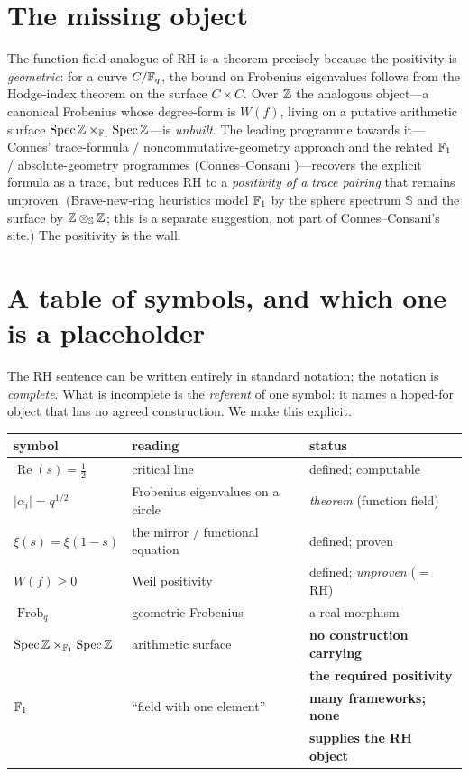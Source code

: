 \documentclass[11pt]{article}
\begin{document}
\section{The missing object}
The function-field analogue of RH is a theorem precisely because the positivity is
\emph{geometric}: for a curve $C/\mathbb{F}_q$, the bound on Frobenius eigenvalues follows
from the Hodge-index theorem on the surface $C\times C$. Over $\mathbb{Z}$ the analogous
object---a canonical Frobenius whose degree-form is $W(f)$, living on a putative
arithmetic surface $\operatorname{Spec}\mathbb{Z}\times_{\mathbb{F}_1}\operatorname{Spec}\mathbb{Z}$---is
\emph{unbuilt}. The leading programme towards it---Connes' trace-formula /
noncommutative-geometry approach and the related $\mathbb{F}_1$ / absolute-geometry
programmes (Connes--Consani \cite{ConnesConsani})---recovers the explicit formula as a
trace, but reduces RH to a \emph{positivity of a trace pairing} that remains unproven.
(Brave-new-ring heuristics model $\mathbb{F}_1$ by the sphere spectrum $\mathbb{S}$ and the
surface by $\mathbb{Z}\otimes_{\mathbb{S}}\mathbb{Z}$; this is a separate suggestion, not part of
Connes--Consani's site.) The positivity is the wall.

\section{A table of symbols, and which one is a placeholder}
The RH sentence can be written entirely in standard notation; the notation is
\emph{complete}. What is incomplete is the \emph{referent} of one symbol: it names a
hoped-for object that has no agreed construction. We make this explicit.

\begin{center}\small
\begin{tabular}{lll}
\hline
symbol & reading & status \\
\hline
$\operatorname{Re}(s)=\tfrac12$ & critical line & defined; computable \\
$|\alpha_i|=q^{1/2}$ & Frobenius eigenvalues on a circle & \emph{theorem} (function field) \\
$\xi(s)=\xi(1-s)$ & the mirror / functional equation & defined; proven \\
$W(f)\ge 0$ & Weil positivity & defined; \emph{unproven} ($=$ RH) \\
$\operatorname{Frob}_q$ & geometric Frobenius & a real morphism \\
$\operatorname{Spec}\mathbb{Z}\times_{\mathbb{F}_1}\operatorname{Spec}\mathbb{Z}$ & arithmetic surface & \textbf{no construction carrying} \\
 & & \textbf{the required positivity} \\
$\mathbb{F}_1$ & ``field with one element'' & \textbf{many frameworks; none} \\
 & & \textbf{supplies the RH object} \\
\hline
\end{tabular}
\end{center}
\end{document}
